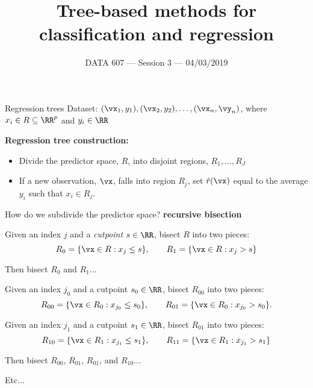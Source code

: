 \documentclass{beamer}
\begin{document}
    
\setlength{\parskip}{1em}
\begin{frame}
    \title{Tree-based methods for classification and regression}
    \date{DATA 607 --- Session 3 --- 04/03/2019}
    \maketitle
\end{frame}


\begin{frame}{Regression trees}
    Dataset: $(\vx_1,y_1), (\vx_2, y_2),\ldots, (\vx_n, \vy_n)$, where $x_i\in R\subseteq\RR^p$ and $y_i\in\RR$

    \textbf{Regression tree construction:}
    \begin{itemize}
        \item Divide the predictor space, $R$, into disjoint regions, $R_1,\ldots,R_J$
        \item If a new observation, $\vx$, falls into region $R_j$, set
        $\hat r(\vx)$ equal to the average $y_i$ such that $x_i\in R_j$.
    \end{itemize}

    How do we subdivide the predictor space? \textbf{recursive bisection}

    Given an index $j$ and a \emph{cutpoint} $s\in\RR$,
    bisect $R$ into two pieces:
    \[
        R_{0} = \{\vx\in R : x_{j} \leq s\},\qquad
        R_{1} = \{\vx\in R : x_{j} > s\}
    \]

    Then bisect $R_{0}$ and $R_{1}$...
\end{frame}

\begin{frame}{}
    Given an index $j_{0}$ and a cutpoint $s_{0}\in\RR$,
    bisect $R_{00}$ into two pieces:
    \[
        R_{00} = \{\vx\in R_{0} : x_{j_{0}} \leq s_{0}\},\qquad
        R_{01} = \{\vx\in R_{0} : x_{j_{0}} > s_{0}\}.
    \]

    Given an index $j_{1}$ and a cutpoint $s_{1}\in\RR$,
    bisect $R_{01}$ into two pieces:
    \[
        R_{10} = \{\vx\in R_{1} : x_{j_{1}} \leq s_{1}\},\qquad
        R_{11} = \{\vx\in R_{1} : x_{j_{1}} > s_{1}\}
    \]

    Then bisect $R_{00}$, $R_{01}$, $R_{01}$, and $R_{10}$...

    Etc...
\end{frame}
\end{document}
